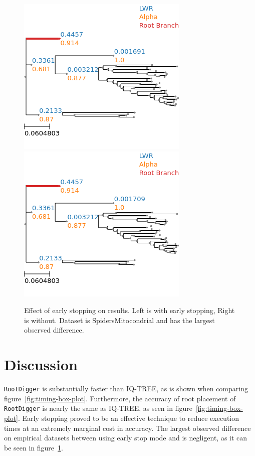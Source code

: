 \documentclass{article}
\newcommand{\RootDiggertt}{\texttt{RootDigger}}
\begin{document}
\begin{figure}[H]
  \begin{center}
    \includegraphics[width=.4\linewidth]{figs/early_stop_tests/es_test_mito_no_outgroup.png}
    \includegraphics[width=.4\linewidth]{figs/early_stop_tests/es_test_mito_no_outgroup_noes.png}
    \caption{Effect of early stopping on results. Left is with early stopping,
    Right is without. Dataset is SpidersMitocondrial and has the largest
  observed difference.}
    \label{fig:es_mito}
  \end{center}
\end{figure}

\section{Discussion}


\RootDiggertt{} is substantially faster than IQ-TREE, as is shown when comparing
figure~\ref{fig:timing-box-plot}. Furthermore, the accuracy of root placement of
\RootDiggertt{} is nearly the same as IQ-TREE, as seen in
figure~\ref{fig:timing-box-plot}.  Early stopping proved to be an effective
technique to reduce execution times at an extremely marginal cost in accuracy.
The largest observed difference on empirical datasets between using early stop
mode and is negligent, as it can be seen in figure~\ref{fig:es_mito}. 
\end{document}
